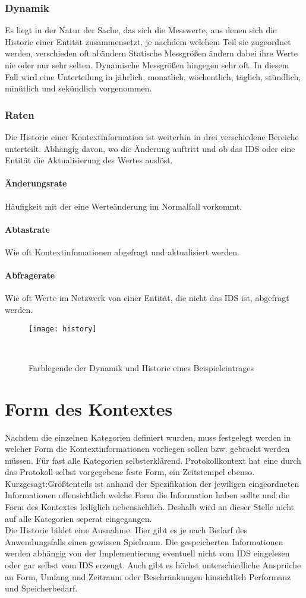 \subsubsection{Dynamik}
Es liegt in der Natur der Sache, das sich die Messwerte, aus denen sich die Historie einer Entität zusammensetzt, je nachdem welchem Teil sie zugeordnet werden, verschieden oft abändern
Statische Messgrößen ändern dabei ihre Werte nie oder nur sehr selten. Dynamische Messgrößen hingegen sehr oft. In diesem Fall wird eine Unterteilung in jährlich, monatlich, wöchentlich, täglich, stündlich, minütlich und sekündlich vorgenommen. 
\subsubsection{Raten}
Die Historie einer Kontextinformation ist weiterhin in drei verschiedene Bereiche unterteilt. Abhängig davon, wo die Änderung auftritt und ob das IDS oder eine Entität die Aktualisierung des Wertes auslöst.
\paragraph{Änderungsrate} 
Häufigkeit mit der eine Werteänderung im Normalfall vorkommt.
\paragraph{Abtastrate}
Wie oft Kontextinfomationen abgefragt und aktualisiert werden.
\paragraph{Abfragerate}
Wie oft Werte im Netzwerk von einer Entität, die nicht das IDS ist, abgefragt werden.
\begin{figure}[H]
\centering
\texttt{[image: history]}
\caption{Farblegende der Dynamik und Historie eines Beispieleintrages}
\
\end{figure}


\section{Form des Kontextes}
Nachdem die einzelnen Kategorien definiert wurden, muss festgelegt werden in welcher Form die Kontextinformationen vorliegen sollen bzw. gebracht werden müssen. Für fast alle Kategorien selbsterklärend. Protokollkontext hat eine durch das Protokoll selbst vorgegebene feste Form, ein Zeitstempel ebenso. Kurzgesagt:Größtenteils ist anhand der Spezifikation der jewiligen eingeordneten Informationen offensichtlich welche Form die Information haben sollte und die Form des Kontextes lediglich nebensächlich. Deshalb wird an dieser Stelle nicht auf alle Kategorien seperat eingegangen.\\
Die Historie bildet eine Ausnahme. Hier gibt es je nach Bedarf des Anwendungsfalls einen gewissen Spielraum. Die gespeicherten Informationen werden abhängig von der Implementierung eventuell nicht vom IDS eingelesen oder gar selbst vom IDS erzeugt. Auch gibt es höchst unterschiedliche Ansprüche an Form, Umfang und Zeitraum oder Beschränkungen hinsichtlich Performanz und Speicherbedarf.
